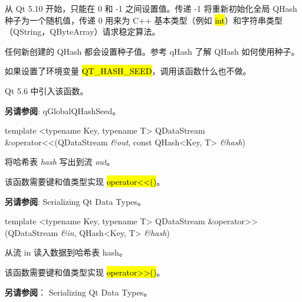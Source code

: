 从 Qt 5.10 开始，只能在 0 和 -1 之间设置值。传递 -1 将重新初始化全局 QHash 种子为一个随机值，传递 0 用来为 C++ 基本类型（例如 \hl{int}）和字符串类型（QString，QByteArray）请求稳定算法。

任何新创建的 QHash 都会设置种子值。参考 qHash 了解 QHash 如何使用种子。

如果设置了环境变量 \hl{QT\_HASH\_SEED}，调用该函数什么也不做。

Qt 5.6 中引入该函数。

\textbf{另请参阅}: qGlobalQHashSeed。

template <typename Key, typename T> QDataStream \&operator<<(QDataStream \emph{\&out}, const QHash<Key, T> \emph{\&hash})

将哈希表 \emph{hash} 写出到流 \emph{out}。

该函数需要键和值类型实现 \hl{operator<<()}。

\textbf{另请参阅}: Serializing Qt Data Types。

template <typename Key, typename T> QDataStream \&operator>>(QDataStream \emph{\&in}, QHash<Key, T> \emph{\&hash})

从流 in 读入数据到哈希表 hash。

该函数需要键和值类型实现 \hl{operator>>()}。

\textbf{另请参阅}： Serializing Qt Data Types。

